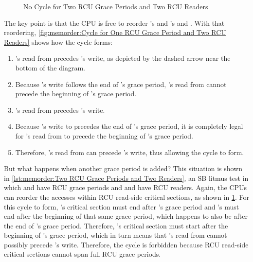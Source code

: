 \begin{figure}
\centering
{}
\caption{No Cycle for Two RCU Grace Periods and Two RCU Readers}
\label{fig:memorder:No Cycle for Two RCU Grace Periods and Two RCU Readers}
\end{figure}

The key point is that the CPU is free to reorder 's and 's
 and .
With that reordering,
\cref{fig:memorder:Cycle for One RCU Grace Period and Two RCU Readers}
shows how the cycle forms:

\begin{enumerate}
\item	{}'s read from  precedes 's write, as
	depicted by the dashed arrow near the bottom of the diagram.
\item	Because 's write follows the end of 's grace period,
	's read from  cannot precede the beginning of
	's grace period.
\item	{}'s read from  precedes 's write.
\item	Because 's write to  precedes the end of
	's grace period, it is completely legal for 's
	read from  to precede the beginning of 's grace period.
\item	Therefore, 's read from  can precede 's
	write, thus allowing the cycle to form.
\end{enumerate}

But what happens when another grace period is added?
This situation is shown in
\cref{lst:memorder:Two RCU Grace Periods and Two Readers},
an SB litmus test in which  and  have RCU grace periods
and  and  have RCU readers.
Again, the CPUs can reorder the accesses within RCU read-side critical
sections, as shown in
\cref{fig:memorder:No Cycle for Two RCU Grace Periods and Two RCU Readers}.
For this cycle to form, 's critical section must
end after 's grace period and 's must end after the
beginning of that same grace period, which happens to also be after the
end of 's grace period.
Therefore, 's critical section must start after the beginning
of 's grace period, which in turn means that 's
read from  cannot possibly precede 's write.
Therefore, the cycle is forbidden because RCU read-side critical sections
cannot span full RCU grace periods.

